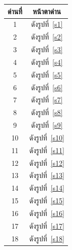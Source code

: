 \begin{table}[H]
    \begin{center}
        \begin{tabular}{|c | c|}
            \hline
            ด่านที่ & หน้าตาด่าน\\
            \hline\hline
            1 &  ดังรูปที่~\ref{s1} \\ 
            \hline
            2 &  ดังรูปที่~\ref{s2} \\ 
            \hline
            3 &  ดังรูปที่~\ref{s3} \\ 
            \hline
            4 &  ดังรูปที่~\ref{s4} \\ 
            \hline
            5 &  ดังรูปที่~\ref{s5} \\ 
            \hline
            6 &  ดังรูปที่~\ref{s6} \\ 
            \hline
            7 &  ดังรูปที่~\ref{s7} \\ 
            \hline
            8 &  ดังรูปที่~\ref{s8} \\ 
            \hline
            9 &  ดังรูปที่~\ref{s9} \\ 
            \hline
            10 &  ดังรูปที่~\ref{s10} \\ 
            \hline
            11 &  ดังรูปที่~\ref{s11} \\ 
            \hline
            12 &  ดังรูปที่~\ref{s12} \\ 
            \hline
            13 &  ดังรูปที่~\ref{s13} \\ 
            \hline
            14 &  ดังรูปที่~\ref{s14} \\ 
            \hline
            15 &  ดังรูปที่~\ref{s15} \\ 
            \hline
            16 &  ดังรูปที่~\ref{s16} \\ 
            \hline
            17 &  ดังรูปที่~\ref{s17} \\ 
            \hline
            18 &  ดังรูปที่~\ref{s18} \\ 
            \hline

\end{tabular}
\end{center}
\end{table}
